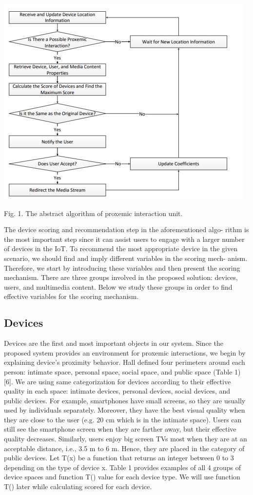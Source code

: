 \documentclass[runningheads,a4paper]{llncs}
\begin{document}
\includegraphics{fig1.jpg}

Fig. 1. The abstract algorithm of proxemic interaction unit.


The device scoring and recommendation step in the aforementioned algo-
rithm is the most important step since it can assist users to engage with a larger
number of devices in the IoT. To recommend the most appropriate device in the
given scenario, we should find and imply different variables in the scoring mech-
anism. Therefore, we start by introducing these variables and then present the
scoring mechanism. There are three groups involved in the proposed solution:
devices, users, and multimedia content. Below we study these groups in order to
find effective variables for the scoring mechanism.

\subsection{Devices}

Devices are the first and most important objects in our system. Since the proposed system provides an environment for proxemic interactions, we begin by
explaining device’s proximity behavior. Hall defined four perimeters around each
person: intimate space, personal space, social space, and public space (Table 1)
[6]. We are using same categorization for devices according to their effective quality in each space: intimate devices, personal devices, social devices, and public
devices. For example, smartphones have small screens, so they are usually used
by individuals separately. Moreover, they have the best visual quality when they
are close to the user (e.g. 20 cm which is in the intimate space). Users can still
see the smartphone screen when they are farther away, but their effective quality decreases. Similarly, users enjoy big screen TVs most when they are at an
acceptable distance, i.e., 3.5 m to 6 m. Hence, they are placed in the category
of public devices. Let T(x) be a function that returns an integer between 0 to 3
depending on the type of device x. Table 1 provides examples of all 4 groups of
device spaces and function T() value for each device type. We will use function
T() later while calculating scored for each device.
\end{document}

